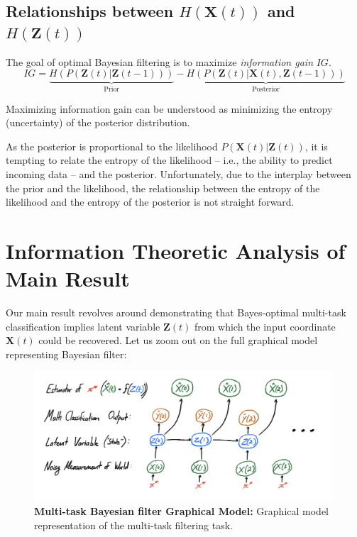 \documentclass[12pt]{article}
\begin{document}
\subsection{Relationships between $H(\mathbf X(t))$ and $H(\mathbf Z(t))$}
The goal of optimal Bayesian filtering is to maximize \textit{information gain} $IG$. 
\begin{equation}
	\label{eqn:info_gain}
	IG = 
		\underbrace{H(P(\mathbf Z(t) | \mathbf Z(t-1)))}_{\text{Prior}}
		-
		\underbrace{H(P(\mathbf Z(t) | \mathbf X(t), \mathbf Z(t-1)))}_{\text{Posterior}}
\end{equation}

Maximizing information gain can be understood as minimizing the entropy (uncertainty) of the posterior distribution.

As the posterior is proportional to the likelihood $P(\mathbf X(t) | \mathbf Z(t))$, it is tempting to relate the entropy of the likelihood -- i.e., the ability to predict incoming data -- and the posterior. 
Unfortunately, due to the interplay between the prior and the likelihood, the relationship between the entropy of the likelihood and the entropy of the posterior is not straight forward. 



\section{Information Theoretic Analysis of Main Result}

Our main result revolves around demonstrating that Bayes-optimal multi-task classification implies latent variable $\mathbf Z(t)$ from which the input coordinate $\mathbf X(t)$ could be recovered. 
Let us zoom out on the full graphical model representing Bayesian filter: 

\begin{figure}[h! tbp]
	\centering 
	\includegraphics[width=0.99\textwidth]{media/bayesian_filter_graphical_model.jpg}
	\caption[Bayesian Filter Graphical Model]{
		\textbf{Multi-task Bayesian filter Graphical Model:} Graphical model representation of the multi-task filtering task. 
	}
	\label{fig:2a}
\end{figure}
\end{document}
